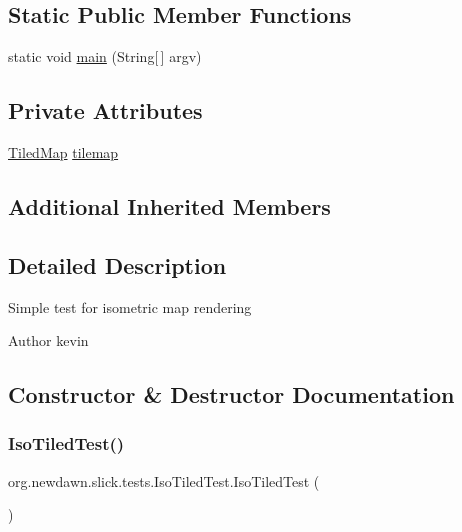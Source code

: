 \subsection*{Static Public Member Functions}
\begin{DoxyCompactItemize}
\item 
static void \mbox{\hyperlink{classorg_1_1newdawn_1_1slick_1_1tests_1_1_iso_tiled_test_a4acd878cac3be46beeab2c9b38f936fa}{main}} (String\mbox{[}$\,$\mbox{]} argv)
\end{DoxyCompactItemize}
\subsection*{Private Attributes}
\begin{DoxyCompactItemize}
\item 
\mbox{\hyperlink{classorg_1_1newdawn_1_1slick_1_1tiled_1_1_tiled_map}{Tiled\+Map}} \mbox{\hyperlink{classorg_1_1newdawn_1_1slick_1_1tests_1_1_iso_tiled_test_a50c678a4d5ae115e8b9c76363c127aab}{tilemap}}
\end{DoxyCompactItemize}
\subsection*{Additional Inherited Members}


\subsection{Detailed Description}
Simple test for isometric map rendering

\begin{DoxyAuthor}{Author}
kevin 
\end{DoxyAuthor}


\subsection{Constructor \& Destructor Documentation}
\mbox{\label{classorg_1_1newdawn_1_1slick_1_1tests_1_1_iso_tiled_test_a270d6b6e63f7271a1caa8cdccb269fe2}} 
\subsubsection{\texorpdfstring{Iso\+Tiled\+Test()}{IsoTiledTest()}}
{\footnotesize\ttfamily org.\+newdawn.\+slick.\+tests.\+Iso\+Tiled\+Test.\+Iso\+Tiled\+Test (\begin{DoxyParamCaption}{ }\end{DoxyParamCaption})\hspace{0.3cm}{\ttfamily [inline]}}

